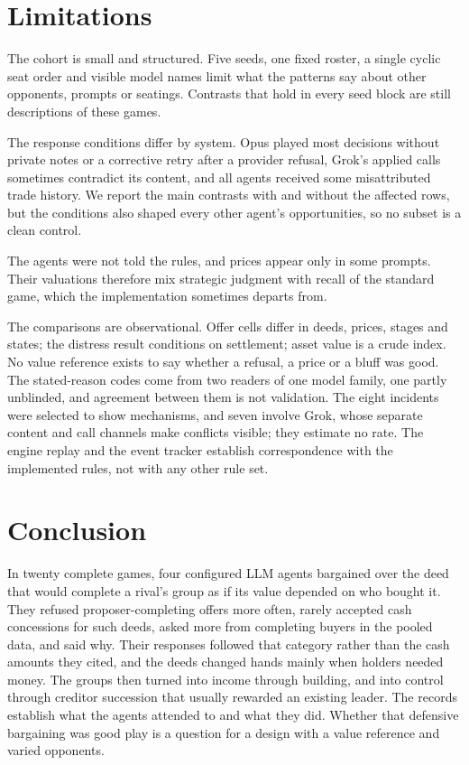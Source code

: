 \section{Limitations}
\label{sec:limits}

The cohort is small and structured. Five seeds, one fixed roster, a single cyclic seat order and visible model names limit what the patterns say about other opponents, prompts or seatings. Contrasts that hold in every seed block are still descriptions of these games.

The response conditions differ by system. Opus played most decisions without private notes or a corrective retry after a provider refusal, Grok's applied calls sometimes contradict its content, and all agents received some misattributed trade history. We report the main contrasts with and without the affected rows, but the conditions also shaped every other agent's opportunities, so no subset is a clean control.

The agents were not told the rules, and prices appear only in some prompts. Their valuations therefore mix strategic judgment with recall of the standard game, which the implementation sometimes departs from.

The comparisons are observational. Offer cells differ in deeds, prices, stages and states; the distress result conditions on settlement; asset value is a crude index. No value reference exists to say whether a refusal, a price or a bluff was good. The stated-reason codes come from two readers of one model family, one partly unblinded, and agreement between them is not validation. The eight incidents were selected to show mechanisms, and seven involve Grok, whose separate content and call channels make conflicts visible; they estimate no rate. The engine replay and the event tracker establish correspondence with the implemented rules, not with any other rule set.

\section{Conclusion}

In twenty complete games, four configured LLM agents bargained over the deed that would complete a rival's group as if its value depended on who bought it. They refused proposer-completing offers more often, rarely accepted cash concessions for such deeds, asked more from completing buyers in the pooled data, and said why. Their responses followed that category rather than the cash amounts they cited, and the deeds changed hands mainly when holders needed money. The groups then turned into income through building, and into control through creditor succession that usually rewarded an existing leader. The records establish what the agents attended to and what they did. Whether that defensive bargaining was good play is a question for a design with a value reference and varied opponents.
